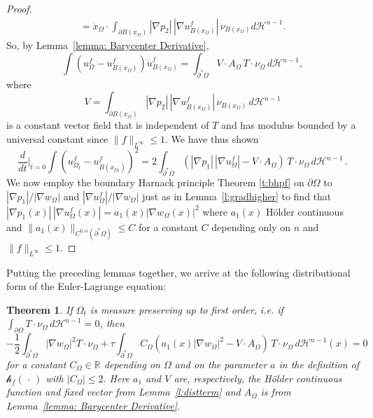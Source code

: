 \documentclass[10pt, reqno]{amsart}
\numberwithin{equation}{section}
\newtheorem{theorem}{Theorem}[section]
\def\R{{\mathbb R}}
\def\W{\Omega}
\def\nl{\mathscr{h}_f}
\def\na{\nabla}
\begin{document}
\begin{proof}
\[\begin{aligned}
 =  \dot{x}_\W \cdot \int_{\partial B(x_{\W})} |\nabla p_2|\,  | \nabla u_{B(x_{\W})}^f| \, \nu_{B(x_\W)} d\mathcal{H}^{n-1}.
 \end{aligned}
 \]
So, by Lemma~\ref{lemma: Barycenter Derivative}, 
 \[
 \int \left(u_{\W}^f - u_{B(x_{\W})}^f \right)\dot{u}_{B(x_{\W})}^f 
 = \int_{\partial^* \W} V \cdot A_{\W} \, T \cdot \nu_{\W}\,  d \mathcal{H}^{n-1},
 \]
 where 
 \[
 V=\int_{\partial B(x_{\W})} |\nabla p_2| \, | \nabla u_{B(x_{\W})}^f| \, \nu_{B(x_\W)} \, d \mathcal{H}^{n-1}
 \]
 is a constant vector field that is independent of $T$ and has modulus bounded by a universal constant since  $\| f \|_{L^{\infty}} \leq 1$. We have thus shown
 \begin{equation}
     \label{eqn: nl term intermediate deriv comp}
  \frac{d}{dt}\Bigr|_{t=0} \int \left(u_{\W_t}^f - u_{B(x_{\W_t})}^f \right)^2 = 2\int_{\partial^* \W} \left(  |\nabla p_1| \, |\nabla  u_{\W}^f| - V\cdot A_\W \right)\, T \cdot \nu_\W \, d\mathcal{H}^{n-1} \,.
  \end{equation}
 We now employ the boundary Harnack principle Theorem \ref{t:bhpf} on $\partial \W$ to $|\na p_1|/|\na w_\W|$ and $|\na u^f_\W| /|\na w_\W|$ just as in Lemma~\ref{l:gradhigher} to find that $|\nabla p_1(x)|\, |\na u_\W^f(x)|=a_1(x)|\nabla w_{\W}(x)|^2$ where $a_1(x)$ H\"older continuous and $ \|a_1(x) \|_{C^{0,\alpha}(\partial^* \W)} \leq C$ for a constant $C$ depending only on $n$ and  $\| f\|_{L^{\infty}} \leq 1$.
\end{proof}







Putting the preceding lemmas together, we arrive at the following distributional form of the Euler-Lagrange equation:
\begin{theorem}  \label{t:vectoreulerlagrange}
  If $\Omega_t$ is measure preserving up to first order, i.e. if $\int_{\partial \W }T\cdot \nu_\W \, d\mathcal{H}^{n-1} = 0$, then 
  \begin{equation}
      \label{eqn: meas pres EL}
 -\frac{1}{2} \int_{\partial^* \W} |\nabla w_{\Omega}|^2 T \cdot \nu_{\W}
 +\tau \int_{\partial^* \W} C_{\Omega}(a_1(x)|\nabla w_{\W}|^2- V\cdot A_\Omega) \, T\cdot \nu_\W \, d \mathcal{H}^{n-1}(x)=0 
   \end{equation}
 for a constant $C_{\W} \in \R$ depending on $\W$ and on the parameter $a$ in the definition of $\nl(\, \cdot\, )$ with $|C_{\W}|\leq 2.$
Here $a_1$ and $V$ are, respectively, the H\"{o}lder continuous function and fixed vector from Lemma~\ref{l:distterm} and $A_\W$ is from Lemma~\ref{lemma: Barycenter Derivative}.
 

\end{theorem}
\end{document}

